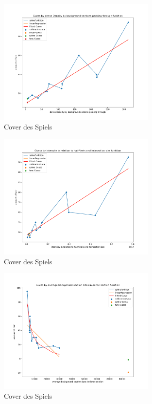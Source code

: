 \documentclass[german,a4paper, 12pt]{scrartcl}
\begin{document}
\begin{figure}
	\centering
	\includegraphics[width=0.7\textwidth]{fig64/g07_denseDensitybyBackgroundSections.png}
	\caption[]{Cover des Spiels}
	\label{img:cover}
\end{figure}
\begin{figure}
	\centering
	\includegraphics[width=0.7\textwidth]{fig64/g08_intensitynorm.png}
	\caption[]{Cover des Spiels}
	\label{img:cover}
\end{figure}
\begin{figure}
	\centering
	\includegraphics[width=0.7\textwidth]{fig64/g09_avgbackgroundsectionsizes.png}
	\caption[]{Cover des Spiels}
	\label{img:cover}
\end{figure}
\end{document}
